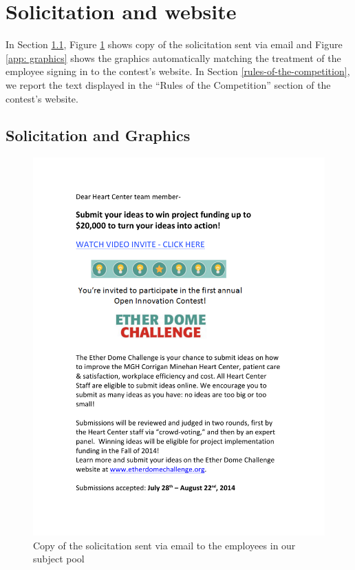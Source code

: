 \documentclass[12pt, titlepage]{article}
\begin{document}
\section{Solicitation and website}\label{solicitation-and-website}

In Section \ref{solicitation-and-graphics}, Figure
\ref{app: solicitation} shows copy of the solicitation sent via email
and Figure \ref{app: graphics} shows the graphics automatically matching
the treatment of the employee signing in to the contest's website. In
Section \ref{rules-of-the-competition}, we report the text displayed in
the ``Rules of the Competition'' section of the contest's website.

\subsection{Solicitation and Graphics}\label{solicitation-and-graphics}

\begin{figure}
\centering
\caption{Copy of the solicitation sent via email to the employees in our subject pool}
\label{app: solicitation}
\includegraphics[width=\textwidth]{Images/solicitationEmail.pdf}
\end{figure}
\end{document}
